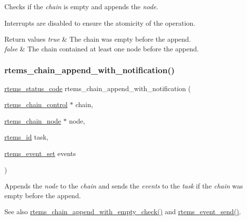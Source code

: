 Checks if the {\itshape chain} is empty and appends the {\itshape node}. 

Interrupts are disabled to ensure the atomicity of the operation.


\begin{DoxyRetVals}{Return values}
{\em true} & The chain was empty before the append. \\
\hline
{\em false} & The chain contained at least one node before the append. \\
\hline
\end{DoxyRetVals}
\mbox{\label{group__ClassicChains_gaa7f797fb91aa37852b3e02dd97ff4e24}} 
\subsubsection{\texorpdfstring{rtems\_chain\_append\_with\_notification()}{rtems\_chain\_append\_with\_notification()}}
{\footnotesize\ttfamily \mbox{\hyperlink{group__ClassicStatus_ga545d41846817eaba6143d52ee4d9e9fe}{rtems\+\_\+status\+\_\+code}} rtems\+\_\+chain\+\_\+append\+\_\+with\+\_\+notification (\begin{DoxyParamCaption}\item[{\mbox{\hyperlink{unionChain__Control}{rtems\+\_\+chain\+\_\+control}} $\ast$}]{chain,  }\item[{\mbox{\hyperlink{structChain__Node__struct}{rtems\+\_\+chain\+\_\+node}} $\ast$}]{node,  }\item[{\mbox{\hyperlink{group__ClassicTasks_gab20892b814dced7dd4e5b9bf42becd57}{rtems\+\_\+id}}}]{task,  }\item[{\mbox{\hyperlink{group__ClassicEventSet_gab7b8f373bea85fd4e3b7ae23905faa07}{rtems\+\_\+event\+\_\+set}}}]{events }\end{DoxyParamCaption})}



Appends the {\itshape node} to the {\itshape chain} and sends the {\itshape events} to the {\itshape task} if the {\itshape chain} was empty before the append. 

\begin{DoxySeeAlso}{See also}
\mbox{\hyperlink{group__ClassicChains_ga18e97328c682a96fbbc983cf624a033b}{rtems\+\_\+chain\+\_\+append\+\_\+with\+\_\+empty\+\_\+check()}} and \mbox{\hyperlink{group__ClassicEvent_ga2d31674c165127bc530178d06d557b94}{rtems\+\_\+event\+\_\+send()}}.
\end{DoxySeeAlso}

